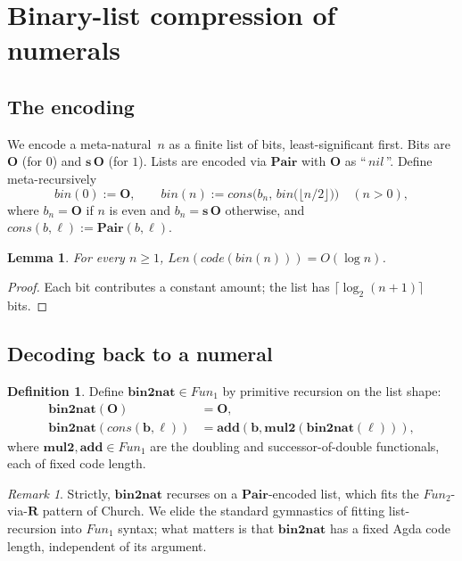 \documentclass[11pt]{article}
\theoremstyle{plain}
\newtheorem{lemma}[theorem]{Lemma}
\theoremstyle{definition}
\newtheorem{definition}[theorem]{Definition}
\theoremstyle{remark}
\newtheorem{remark}[theorem]{Remark}
\newcommand{\code}[1]{\mathit{code}(#1)}
\newcommand{\Pair}{\mathbf{Pair}}
\newcommand{\Fun}{\mathit{Fun}}
\newcommand{\Len}{\mathit{Len}}
\newcommand{\bnt}{\mathbf{bin2nat}}
\newcommand{\bin}{\mathit{bin}}
\newcommand{\cons}{\mathit{cons}}
\newcommand{\nilL}{\mathit{nil}}
\newcommand{\mul}{\mathbf{mul2}}
\newcommand{\add}{\mathbf{add}}
\begin{document}
\section{Binary-list compression of numerals}
\label{sec:bin}

\subsection{The encoding}

We encode a meta-natural~$n$ as a finite list of bits, least-significant
first.  Bits are $\mathbf{O}$ (for $0$) and $\mathbf{s}\,\mathbf{O}$
(for $1$).  Lists are encoded via $\Pair$ with $\mathbf{O}$ as
``\,$\nilL$\,''.  Define meta-recursively
\begin{equation}
\bin(0) := \mathbf{O}, \qquad
\bin(n) := \cons\bigl(b_n,\, \bin\bigl(\lfloor n/2 \rfloor\bigr)\bigr)
\quad (n > 0),
\label{eq:bin-meta}
\end{equation}
where $b_n = \mathbf{O}$ if $n$ is even and $b_n = \mathbf{s}\,\mathbf{O}$
otherwise, and $\cons(b, \ell) := \Pair(b, \ell)$.

\begin{lemma}\label{lem:bin-length}
For every $n \geq 1$, $\Len(\code{\bin(n)}) = O(\log n)$.
\end{lemma}

\begin{proof}
Each bit contributes a constant amount; the list has
$\lceil \log_2(n+1) \rceil$ bits.
\end{proof}

\subsection{Decoding back to a numeral}

\begin{definition}\label{def:bin2nat}
Define $\bnt \in \Fun_1$ by primitive recursion on the list shape:
\begin{align*}
\bnt(\mathbf{O}) &= \mathbf{O}, \\
\bnt(\cons(\mathbf{b}, \ell)) &= \add(\mathbf{b}, \mul(\bnt(\ell))),
\end{align*}
where $\mul, \add \in \Fun_1$ are the doubling and successor-of-double
functionals, each of fixed code length.
\end{definition}

\begin{remark}
Strictly, $\bnt$ recurses on a $\Pair$-encoded list, which fits the
$\Fun_2$-via-$\mathbf{R}$ pattern of Church.  We elide the standard
gymnastics of fitting list-recursion into $\Fun_1$ syntax; what
matters is that $\bnt$ has a fixed Agda code length, independent of
its argument.
\end{remark}
\end{document}
